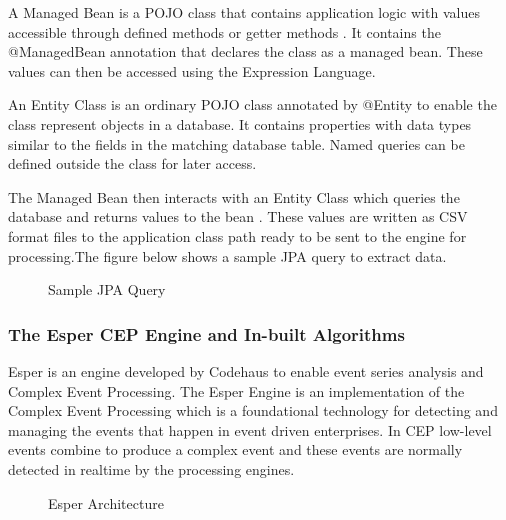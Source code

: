 \noindent A Managed Bean is a POJO class that contains application logic with values accessible through defined methods or getter methods . It contains the @ManagedBean annotation that declares the class as a managed bean. These values can then be accessed using the Expression Language.

\noindent An Entity Class is an ordinary POJO class annotated by @Entity to enable the class represent objects in a database. It contains properties with data types similar to the fields in the matching  database table. Named queries can be defined outside the class for later access.

\noindent The Managed Bean then interacts with an Entity Class which queries the database and returns values to the bean . These values are written as CSV format files to the application class path  ready to be sent to the engine for processing.The figure below shows a sample  JPA query to extract data.






\begin{center}
\begin{figure}[h]
\caption{Sample JPA Query }

\end{figure}
\end{center}

\subsubsection{The Esper CEP Engine and In-built Algorithms}

\noindent Esper is an engine developed by Codehaus \cite{twentyfive} to enable  event series analysis and Complex Event Processing. The Esper Engine is an implementation of the Complex Event Processing which is a foundational technology for detecting and managing the events that happen in event driven enterprises. In CEP low-level events combine to produce a complex event and these events are normally detected in realtime by the processing engines. 
\newpage

\begin{center}
\begin{figure}[h]
\caption{Esper Architecture\cite{twentyfive}}

\end{figure}
\end{center}
 

